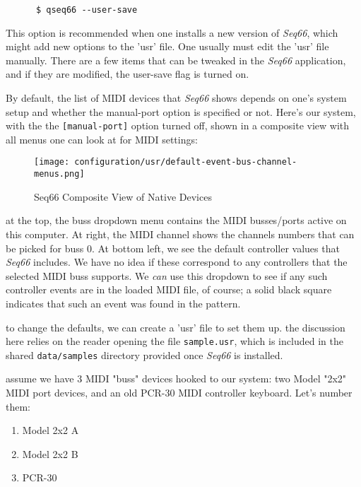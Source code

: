    \begin{verbatim}
      $ qseq66 --user-save
   \end{verbatim}

   This option is recommended when one installs a new version of
   \textsl{Seq66}, which might add new options to the 'usr' file.
   One usually must edit the 'usr' file manually.
   There are a few items that can be tweaked in the \textsl{Seq66} application,
   and if they are modified, the user-save flag is turned on.

   By default, the list of MIDI devices that \textsl{Seq66} shows depends
   on one's system setup and whether the manual-port option is specified
   or not.  Here's our system, with the
   the \texttt{[manual-port]} option turned off, shown in a
   composite view with all menus one can look at for MIDI settings:

\begin{figure}[H]
   \centering 
   \texttt{[image: configuration/usr/default-event-bus-channel-menus.png]}
   \caption{Seq66 Composite View of Native Devices}
   \label{fig:default_event_bus_channel_menus}
\end{figure}

   at the top, the buss dropdown menu contains the MIDI busses/ports
   active on this computer.  At right, the MIDI channel shows
   the channels numbers that can be picked for buss 0.  At bottom left, we see
   the default controller values that \textsl{Seq66} includes.  We have
   no idea if these correspond to any controllers that the selected MIDI buss
   supports.  We \textsl{can} use this dropdown to see if any such controller
   events are in the loaded MIDI file, of course; a solid black square
   indicates that such an event was found in the pattern.

   to change the defaults, we can create a 'usr' file to set them up.
   the discussion here relies on the reader opening the file
   \texttt{sample.usr}, which is included in the shared \texttt{data/samples}
   directory provided once \textsl{Seq66} is installed.

   assume we have 3 MIDI "buss" devices hooked to our system:
   two Model "2x2" MIDI port devices, and an old PCR-30 MIDI controller
   keyboard.  Let's number them:

   \begin{enumerate}
      \item Model 2x2 A
      \item Model 2x2 B
      \item PCR-30
   \end{enumerate}

